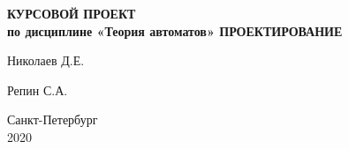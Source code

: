 \begin{titlepage}
\begin{center}
    \vfill

    \uppercase{\textbf{\large{
        Курсовой проект
    }}}
    \\
    \textbf{\large{
      по дисциплине «Теория автоматов»
    }}
    \vfill
    \uppercase{\textbf{\Large{
        Проектирование
    }}}
  \bigskip
\end{center}

\vfill

\begin{flushright}
    Николаев Д.Е.
\end{flushright}

\begin{flushright}
    Репин С.А.
\end{flushright}

\hfill
\hfill

\begin{center}
  Санкт-Петербург\\2020
\end{center}

\end{titlepage}

